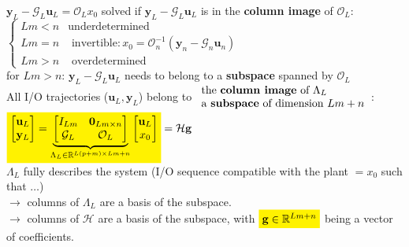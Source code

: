 \textbullet \; $\textbf{y}_L - \mathcal{G}_L \textbf{u}_L = \mathcal{O}_L x_0$ \quad solved if $\textbf{y}_L - \mathcal{G}_L \textbf{u}_L$ is in the \textbf{column image} of $\mathcal{O}_L$: $\begin{cases} 
    Lm<n &\text{underdetermined} \\ 
    Lm=n &\text{ invertible}: x_0 = \mathcal{O}_n^{-1} (\textbf{y}_n - \mathcal{G}_n \textbf{u}_n) \\ 
    Lm>n &\text{ overdetermined}
\end{cases}$\\
\textbullet \; for $Lm > n$: $\mathbf{y}_L - \mathcal{G}_L \mathbf{u}_L$ \; needs to belong to a \textbf{subspace} spanned by $\mathcal{O}_L$ \\
    \textbullet \; All I/O trajectories ($\textbf{u}_L, \textbf{y}_L$) belong to 
    $\begin{array}{ll}
        \text{the \textbf{column image} of } \Lambda_L \\
        \text{a \textbf{subspace} of dimension } Lm + n 
    \end{array}$: \quad
    $\stabilo{\begin{bmatrix}
    \mathbf{u}_L \\
    \mathbf{y}_L
    \end{bmatrix}
    =
    \underbrace{
    \begin{bmatrix}
    I_{Lm} & \mathbf{0}_{Lm \times n} \\
    \mathcal{G}_L & \mathcal{O}_L
    \end{bmatrix}
    }_{\Lambda_L \in \mathbb{R}^{L(p+m) \times Lm+n}}
    \begin{bmatrix}
    \mathbf{u}_L \\
    x_0
    \end{bmatrix}} = \mathcal{H} \textbf{g}$ \\
\textbullet \; $\Lambda_L$ fully describes the system (I/O sequence compatible with the plant $= x_0$ such that $\ldots$)\\
$\rightarrow$ columns of $\Lambda_L$ are a basis of the subspace. \\
$\rightarrow$ columns of $\mathcal{H}$ are a basis of the subspace, with $\stabilo{\mathbf{g} \in \mathbb{R}^{Lm+n}}$ being a vector of coefficients.

\newpage

